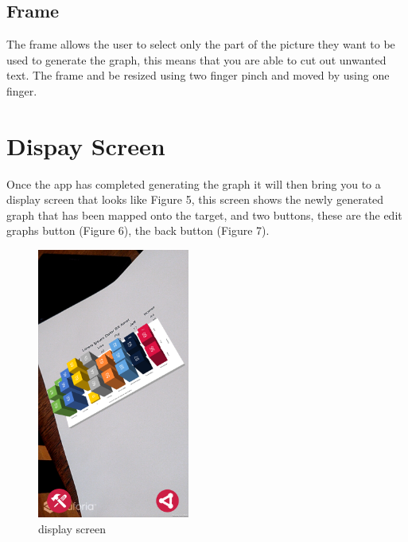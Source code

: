 \documentclass[a4paper,12pt]{article}
\begin{document}
\subsection{Frame}
The frame allows the user to select only the part of the picture they want to be used to generate the graph, this means that you are able to cut out unwanted text. The frame and be resized using two finger pinch and moved by using one finger.
\section{Dispay Screen}
Once the app has completed generating the graph it will then bring you to a display screen that looks like Figure 5, this screen shows the newly generated graph that has been mapped onto the target, and two buttons, these are the edit graphs button (Figure 6), the back button (Figure 7).

\begin{figure}[H]
\centering
	\includegraphics[width=5cm]{images/graph.png}
	\caption{display screen \label{overflow}}
\end{figure}
\end{document}
